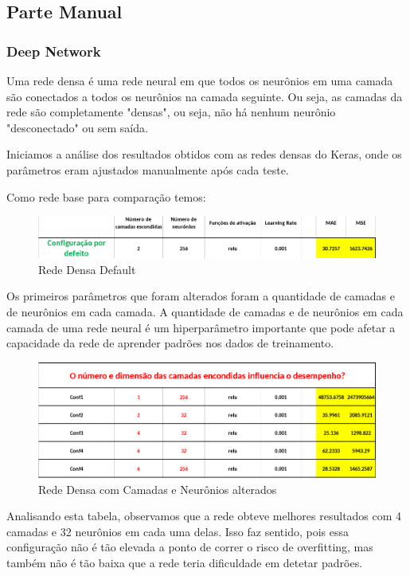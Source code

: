 \documentclass[10pt]{article}
\begin{document}
\subsection{Parte Manual}
\subsubsection{Deep Network}
Uma rede densa é uma rede neural em que todos os neurônios em uma camada são 
conectados a todos os neurônios na camada seguinte. Ou seja, as camadas da 
rede são completamente "densas", ou seja, não há nenhum neurônio 
"desconectado" ou sem saída.

Iniciamos a análise dos resultados obtidos com as redes densas do Keras, 
onde os parâmetros eram ajustados manualmente após cada teste.

Como rede base para comparação temos:

\begin{figure}[htb]
  \centering
  \includegraphics[width=\linewidth]{img/deep_default.png}
  \caption{Rede Densa Default}
  \label{fig:deep_default}
\end{figure}

\newpage
Os primeiros parâmetros que foram alterados foram a quantidade de 
camadas e de neurônios em cada camada.
A quantidade de camadas e de neurônios em cada camada de uma rede neural é 
um hiperparâmetro importante que pode afetar a capacidade da rede de aprender 
padrões nos dados de treinamento.

\begin{figure}[htb]
  \centering
  \includegraphics[width=\linewidth]{img/deep_camadas_neuronios.png}
  \caption{Rede Densa com Camadas e Neurônios alterados}
  \label{fig:deep_camadas_neuronios}
\end{figure}

Analisando esta tabela, observamos que a rede obteve melhores 
resultados com 4 camadas e 32 neurônios em cada uma delas. Isso faz sentido, 
pois essa configuração não é tão elevada a ponto de correr o risco de 
overfitting, mas também não é tão baixa que a rede teria dificuldade 
em detetar padrões.
\end{document}
